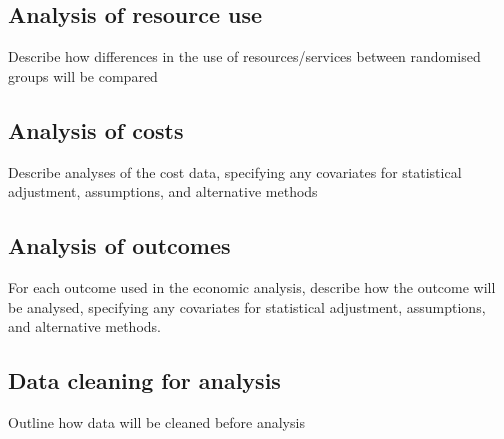 \subsection{Analysis of resource use}

Describe how differences in the use of resources/services between
randomised groups will be compared


\subsection{Analysis of costs}

Describe analyses of the cost data, specifying any covariates for
statistical adjustment, assumptions, and alternative methods



\subsection{Analysis of outcomes}

For each outcome used in the economic analysis, describe how the
outcome will be analysed, specifying any covariates for statistical
adjustment, assumptions, and alternative methods.



\subsection{Data cleaning for analysis}

Outline how data will be cleaned before analysis


